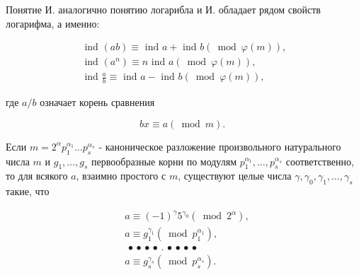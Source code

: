 \documentclass[10pt]{article}
\begin{document}
Понятие И. аналогично понятию логарибла и И. обладает рядом свойств логарифма, а именно:



\[

\begin{gathered}

\text { ind }(a b) \equiv \text { ind } a+\text { ind } b(\bmod \varphi(m)), \\

\text { ind }\left(a^{n}\right) \equiv n \text { ind } a(\bmod \varphi(m)), \\

\text { ind } \frac{a}{b} \equiv \text { ind } a-\text { ind } b(\bmod \varphi(m)),

\end{gathered}

\]



где $a / b$ означает корень сравнения



\[

b x \equiv a(\bmod m) \text {. }

\]



Если $m=2^{\alpha} p_{1}^{\alpha_{1}} \ldots p_{s}^{\alpha_{s}}$ - каноническое разложение произвольного натурального числа $m$ и $g_{1}, \ldots, g_{s}$ первообразные корни по модулям $p_{1}^{\alpha_{1}}, \ldots, p_{s}^{\alpha_{s}}$ соответственно, то для всякого $a$, взаимно простого с $m$, существуют целые числа $\gamma, \gamma_{0}, \gamma_{1}, \ldots, \gamma_{s}$ такие, что



\[

\begin{aligned}

& a \equiv(-1)^{\gamma} 5^{\gamma_{0}}\left(\bmod 2^{\alpha}\right) \text {, } \\

& a \equiv g_{1}^{\gamma_{1}}\left(\bmod p_{1}^{\alpha_{1}}\right) \text {, } \\

& \text { • • • • . • • • • } \\

& a \equiv g_{s}^{\gamma_{s}}\left(\bmod p_{s}^{\alpha_{s}}\right) \text {. }

\end{aligned}

\]
\end{document}
